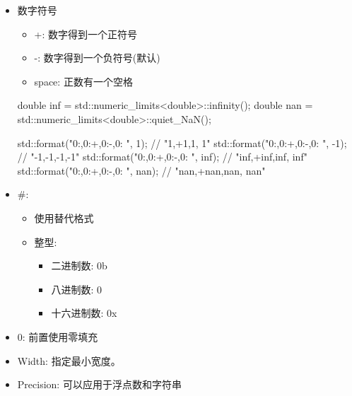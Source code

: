 \begin{itemize}
\item 
数字符号

\begin{itemize}
\item 
+: 数字得到一个正符号

\item 
-: 数字得到一个负符号(默认)

\item 
space: 正数有一个空格
\end{itemize}

\begin{cpp}
double inf = std::numeric_limits<double>::infinity();
double nan = std::numeric_limits<double>::quiet_NaN();

std::format("{0:},{0:+},{0:-},{0: }", 1); // "1,+1,1, 1"
std::format("{0:},{0:+},{0:-},{0: }", -1); // "-1,-1,-1,-1"
std::format("{0:},{0:+},{0:-},{0: }", inf); // "inf,+inf,inf, inf"
std::format("{0:},{0:+},{0:-},{0: }", nan); // "nan,+nan,nan, nan"
\end{cpp}

\item 
\#:

\begin{itemize}
\item 
使用替代格式

\item 
整型:

\begin{itemize}
\item 
二进制数: 0b

\item 
八进制数: 0

\item 
十六进制数: 0x
\end{itemize}

\end{itemize}

\item 
0: 前置使用零填充


\item 
Width: 指定最小宽度。


\item 
Precision: 可以应用于浮点数和字符串


\end{itemize}
